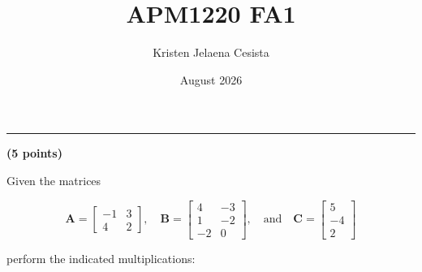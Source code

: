 \documentclass[12pt]{article}
\title{APM1220 FA1}
\author{Kristen Jelaena Cesista}
\date{August 2026}
\begin{document}
\maketitle

\noindent\rule{\textwidth}{0.4pt}

\vspace{2em}

 \hfill {\large \textbf{(5 points)}}

\vspace{1em}

\noindent Given the matrices

$$
\mathbf{A} = \begin{bmatrix} -1 & 3 \\ 4 & 2 \end{bmatrix}, \quad
\mathbf{B} = \begin{bmatrix} 4 & -3 \\ 1 & -2 \\ -2 & 0 \end{bmatrix}, \quad \text{and} \quad
\mathbf{C} = \begin{bmatrix} 5 \\ -4 \\ 2 \end{bmatrix}
$$

\noindent perform the indicated multiplications:
\end{document}
